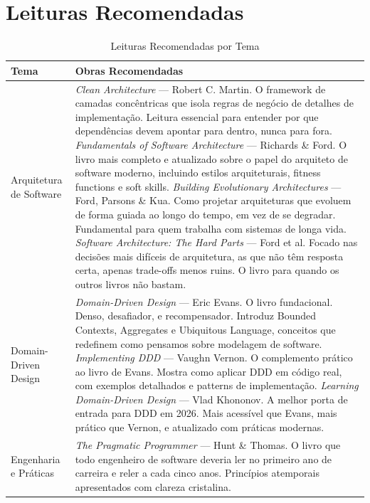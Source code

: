 \section*{Leituras Recomendadas}

\begin{table}[h]
\centering
\caption{Leituras Recomendadas por Tema}
\begin{tabular}{p{3.5cm} p{8cm}}
\toprule
\textbf{Tema} & \textbf{Obras Recomendadas} \\
\midrule
Arquitetura de Software &
    \textit{Clean Architecture} --- Robert C. Martin.
    O framework de camadas concêntricas que isola regras de negócio de detalhes de implementação. Leitura essencial para entender por que dependências devem apontar para dentro, nunca para fora. \newline
    \textit{Fundamentals of Software Architecture} --- Richards \& Ford.
    O livro mais completo e atualizado sobre o papel do arquiteto de software moderno, incluindo estilos arquiteturais, fitness functions e soft skills. \newline
    \textit{Building Evolutionary Architectures} --- Ford, Parsons \& Kua.
    Como projetar arquiteturas que evoluem de forma guiada ao longo do tempo, em vez de se degradar. Fundamental para quem trabalha com sistemas de longa vida. \newline
    \textit{Software Architecture: The Hard Parts} --- Ford et al.
    Focado nas decisões mais difíceis de arquitetura, as que não têm resposta certa, apenas trade-offs menos ruins. O livro para quando os outros livros não bastam. \\
\midrule
Domain-Driven Design &
    \textit{Domain-Driven Design} --- Eric Evans.
    O livro fundacional. Denso, desafiador, e recompensador. Introduz Bounded Contexts, Aggregates e Ubiquitous Language, conceitos que redefinem como pensamos sobre modelagem de software. \newline
    \textit{Implementing DDD} --- Vaughn Vernon.
    O complemento prático ao livro de Evans. Mostra como aplicar DDD em código real, com exemplos detalhados e patterns de implementação. \newline
    \textit{Learning Domain-Driven Design} --- Vlad Khononov.
    A melhor porta de entrada para DDD em 2026. Mais acessível que Evans, mais prático que Vernon, e atualizado com práticas modernas. \\
\midrule
Engenharia e Práticas &
    \textit{The Pragmatic Programmer} --- Hunt \& Thomas.
    O livro que todo engenheiro de software deveria ler no primeiro ano de carreira e reler a cada cinco anos. Princípios atemporais apresentados com clareza cristalina. \newline

\end{tabular}
\end{table}
